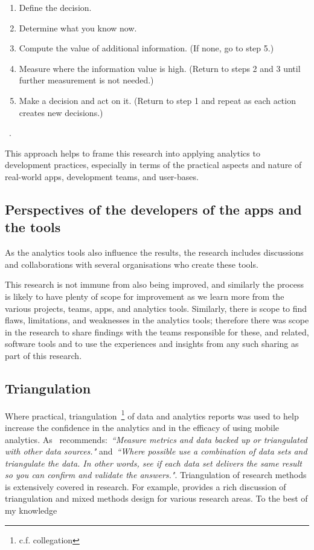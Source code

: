 \begin{enumerate}
    \item Define the decision.
    \item Determine what you know now.
    \item Compute the value of additional information. (If none, go to step 5.)
    \item Measure where the information value is high. (Return to steps 2 and 3 until further measurement is not needed.)
    \item Make a decision and act on it. (Return to step 1 and repeat as each action creates new decisions.)
\end{enumerate} ~\cite[p.9]{hubbard2014measure}.

This approach helps to frame this research into applying analytics to development practices, especially in terms of the practical aspects and nature of real-world apps, development teams, and user-bases.




\subsection{Perspectives of the developers of the apps and the tools}
As the analytics tools also influence the results, the research includes discussions and collaborations with several organisations who create these tools.

This research is not immune from also being improved, and similarly the process is likely to have plenty of scope for improvement as we learn more from the various projects, teams, apps, and analytics tools. Similarly, there is scope to find flaws, limitations, and weaknesses in the analytics tools; therefore there was scope in the research to share findings with the teams responsible for these, and related, software tools and to use the experiences and insights from any such sharing as part of this research.



\subsection{Triangulation}
Where practical, triangulation~\footnote{c.f. collegation} of data and analytics reports was used to help increase the confidence in the analytics and in the efficacy of using mobile analytics. As~\citep{marr2015bigdatabook} recommends:~\emph{``Measure metrics and data backed up or triangulated with other data sources."} and~\emph{``Where possible use a combination of data sets and triangulate the data. In other words, see if each data set delivers the same result so you can confirm and validate the answers."}. Triangulation of research methods is extensively covered in research. For example, \citep{fielding2012_triangulation_and_mixed_methods_designs} provides a rich discussion of triangulation and mixed methods design for various research areas. To the best of my knowledge  %

